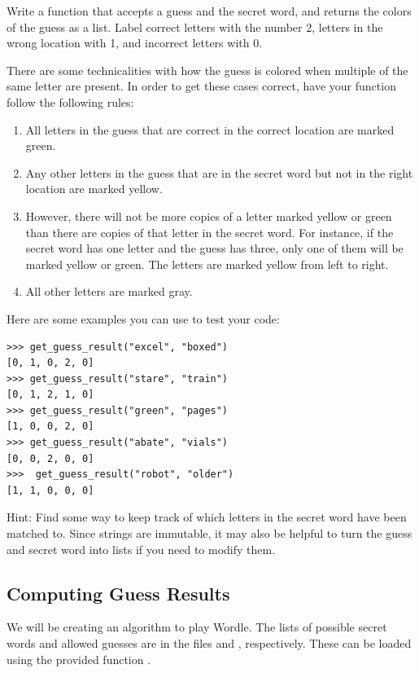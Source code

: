 \begin{problem}
	Write a function  that accepts a guess and the secret word, and returns the colors of the guess as a list.
	Label correct letters with the number 2, letters in the wrong location with 1, and incorrect letters with 0.

There are some technicalities with how the guess is colored when multiple of the same letter are present.
In order to get these cases correct, have your function follow the following rules:
\begin{enumerate}
\item All letters in the guess that are correct in the correct location are marked green.
\item Any other letters in the guess that are in the secret word but not in the right location are marked yellow.
\item However, there will not be more copies of a letter marked yellow or green than there are copies of that letter in the secret word.
For instance, if the secret word has one letter  and the guess has three, only one of them will be marked yellow or green.
The letters are marked yellow from left to right.
\item All other letters are marked gray.
\end{enumerate}

	Here are some examples you can use to test your code:
\begin{lstlisting}
>>> get_guess_result("excel", "boxed")
[0, 1, 0, 2, 0]
>>> get_guess_result("stare", "train")
[0, 1, 2, 1, 0]
>>> get_guess_result("green", "pages")
[1, 0, 0, 2, 0]
>>> get_guess_result("abate", "vials")
[0, 0, 2, 0, 0]
>>>  get_guess_result("robot", "older")
[1, 1, 0, 0, 0]
\end{lstlisting}

	Hint: Find some way to keep track of which letters in the secret word have been matched to.
	Since strings are immutable, it may also be helpful to turn the guess and secret word into lists if you need to modify them.
\end{problem}

\subsection*{Computing Guess Results}
We will be creating an algorithm to play Wordle.
The lists of possible secret words and allowed guesses are in the files  and , respectively.
These can be loaded using the provided function .

